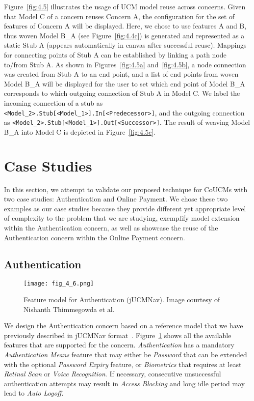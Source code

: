 Figure~\ref{fig:4.5} illustrates the usage of UCM model reuse across concerns. Given that Model C of a concern reuses Concern A, the configuration for the set of features of Concern A will be displayed. Here, we chose to use features A and B, thus woven Model B\_A (see Figure~\ref{fig:4.4c}) is generated and represented as a static Stub A (appears automatically in canvas after successful reuse). Mappings for connecting points of Stub A can be established by linking a path node to/from Stub A. As shown in Figures~\ref{fig:4.5a} and~\ref{fig:4.5b}, a node connection was created from Stub A to an end point, and a list of end points from woven Model B\_A will be displayed for the user to set which end point of Model B\_A corresponds to which outgoing connection of Stub A in Model C. We label the incoming connection of a stub as \verb|<Model_2>.Stub[<Model_1>].In[<Predecessor>]|, and the outgoing connection as \verb|<Model_2>.Stub[<Model_1>].Out[<Successor>]|. The result of weaving Model B\_A into Model C is depicted in Figure~\ref{fig:4.5c}.

\section{Case Studies} \label{sec:4.2}

In this section, we attempt to validate our proposed technique for CoUCMs with two case studies: Authentication and Online Payment. We chose these two examples as our case studies because they provide different yet appropriate level of complexity to the problem that we are studying, exemplify model extension within the Authentication concern, as well as showcase the reuse of the Authentication concern within the Online Payment concern.

\subsection{Authentication}

\begin{figure}[h]
	\centering
	\texttt{[image: fig\_4\_6.png]}
	\caption[Feature model for Authentication (jUCMNav)]{Feature model for Authentication (jUCMNav). Image courtesy of Nishanth Thimmegowda et al.~\cite{thimmegowda2014concern}}
	\label{fig:4.6}
\end{figure}

We design the Authentication concern based on a reference model that we have previously described in jUCMNav format~\cite{thimmegowda2014concern}. Figure~\ref{fig:4.6} shows all the available features that are supported for the concern. \emph{Authentication} has a mandatory \emph{Authentication Means} feature that may either be \emph{Password} that can be extended with the optional \emph{Password Expiry} feature, or \emph{Biometrics} that requires at least \emph{Retinal Scan} or \emph{Voice Recognition}. If necessary, consecutive unsuccessful authentication attempts may result in \emph{Access Blocking} and long idle period may lead to \emph{Auto Logoff}.

